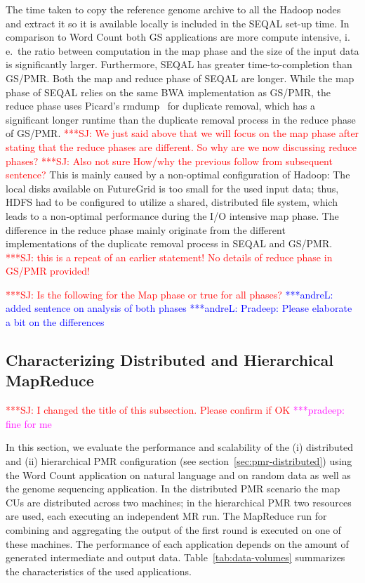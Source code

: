 \documentclass{acm_proc_article-sp}
\newcommand{\jhanote}[1]{ {\textcolor{red} { ***SJ: #1 }}}
\newcommand{\alnote}[1]{ {\textcolor{blue} { ***andreL: #1 }}}
\newcommand{\pnote}[1]{ {\textcolor{magenta} { ***pradeep: #1 }}}
\newcommand{\alnote}[1]{}
\newcommand{\pnote}[1]{}
\newcommand{\jhanote}[1]{}
\newcommand{\upp}{\vspace*{-0.5em}}
\begin{document}
The time taken to copy the reference genome archive to all the Hadoop
nodes and extract it so it is available locally is included in the
SEQAL set-up time. In comparison to Word Count both GS applications
are more compute intensive, i.\,e.\ the ratio between computation in
the map phase and the size of the input data is significantly
larger. Furthermore, SEQAL has greater time-to-completion than
GS/PMR. Both the map and reduce phase of SEQAL are longer. While the
map phase of SEQAL relies on the same BWA implementation as GS/PMR,
the reduce phase uses Picard's rmdump~\cite{picard} for duplicate
removal, which has a significant longer runtime than the duplicate
removal process in the reduce phase of GS/PMR.  \jhanote{We just said
  above that we will focus on the map phase after stating that the
  reduce phases are different. So why are we now discussing reduce
  phases?}  \jhanote{Also not sure How/why the previous follow from
  subsequent sentence?}  This is mainly caused by a non-optimal
configuration of Hadoop: The local disks available on FutureGrid is
too small for the used input data; thus, HDFS had to be configured to
utilize a shared, distributed file system, which leads to a
non-optimal performance during the I/O intensive map phase. The
difference in the reduce phase mainly originate from the different
implementations of the duplicate removal process in SEQAL and
GS/PMR. \jhanote{this is a repeat of an earlier statement! No details
  of reduce phase in GS/PMR provided!}

\jhanote{Is the
  following for the Map phase or true for all phases?} \alnote{added
  sentence on analysis of both phases} 
\alnote{Pradeep: Please elaborate a bit on the differences}
\upp\upp

\subsection{Characterizing Distributed and Hierarchical MapReduce}

\jhanote{I changed the title of this subsection. Please confirm if OK}
\pnote{fine for me}

In this section, we evaluate the performance and scalability of the
(i) distributed and (ii) hierarchical PMR configuration (see
section~\ref{sec:pmr-distributed}) using the Word Count application on
natural language and on random data as well as the genome sequencing
application. In the distributed PMR scenario the map CUs are
distributed across two machines; in the hierarchical PMR two
resources are used, each executing an independent MR run. The MapReduce
run for combining and aggregating the output of the first round is
executed on one of these machines. The performance of each application
depends on the amount of generated intermediate and output data.
Table~\ref{tab:data-volumes} summarizes the characteristics of the
used applications.
\end{document}
